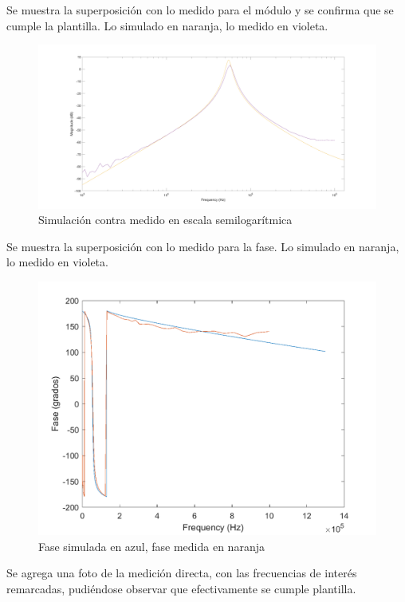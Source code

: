 \documentclass[../../tc_tp5_main.tex]{subfiles}
\begin{document}
	Se muestra la superposición con lo medido para el módulo y se confirma que se cumple la plantilla. Lo simulado en naranja, lo medido en violeta.
	 	\begin{figure}[H]	%
	\centering
	\includegraphics[scale=0.2]{imagenes/montecarlo_superpuesto.png}
	\caption{Simulación contra medido en escala semilogarítmica}
	\label{fig:ej2_montecarlo_superpuesto}
	\end{figure}
		Se muestra la superposición con lo medido para la fase. Lo simulado en naranja, lo medido en violeta.\par
	\begin{figure}[H]	%
	\centering
	\includegraphics[scale=0.3]{imagenes/fase.png}
	\caption{Fase simulada en azul, fase medida en naranja}
	\label{fig:ej2_fase}
	\end{figure}
	Se agrega una foto de la medición directa, con las frecuencias de interés remarcadas, pudiéndose observar que efectivamente se cumple plantilla.
	
\end{document}
